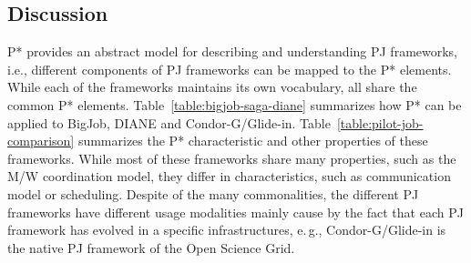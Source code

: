 \documentclass[conference]{IEEEtran}
\begin{document}
\subsection{Discussion}

P* provides an abstract model for describing and understanding PJ
frameworks, i.e., different components of PJ frameworks can be mapped
to the P* elements.  While each of the frameworks maintains its own
vocabulary, all share the common P* elements.
Table~\ref{table:bigjob-saga-diane} summarizes how P* can be applied
to BigJob, DIANE and Condor-G/Glide-in.
Table~\ref{table:pilot-job-comparison} summarizes the P*
characteristic and other properties of these frameworks. While most of
these frameworks share many properties, such as the M/W coordination
model, they differ in characteristics, such as communication model
or scheduling. Despite of the many commonalities, the different PJ frameworks 
have different usage modalities mainly cause by the fact that each PJ 
framework  has evolved in a specific infrastructures, e.\,g., 
Condor-G/Glide-in is the native PJ framework of the Open Science Grid.











% 
\end{document}
